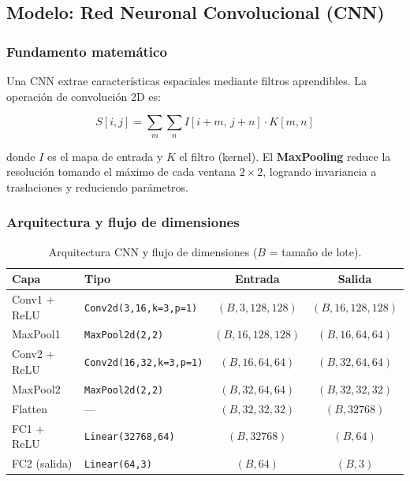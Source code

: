 \documentclass[12pt,a4paper]{article}
\begin{document}
\subsection{Modelo: Red Neuronal Convolucional (CNN)}

\subsubsection{Fundamento matemático}

Una CNN extrae características espaciales mediante filtros aprendibles.
La operación de convolución 2D es:

\[
  S[i,j] = \sum_{m}\sum_{n} I[i+m,\, j+n] \cdot K[m,n]
\]

donde $I$ es el mapa de entrada y $K$ el filtro (kernel). El \textbf{MaxPooling}
reduce la resolución tomando el máximo de cada ventana $2 \times 2$, logrando
invariancia a traslaciones y reduciendo parámetros.

\subsubsection{Arquitectura y flujo de dimensiones}

\begin{table}[H]
  \centering
  \small
  \begin{tabular}{llcc}
    \toprule
    \textbf{Capa} & \textbf{Tipo} & \textbf{Entrada} & \textbf{Salida} \\
    \midrule
    Conv1 + ReLU & \texttt{Conv2d(3,16,k=3,p=1)}  & $(B,3,128,128)$  & $(B,16,128,128)$ \\
    MaxPool1     & \texttt{MaxPool2d(2,2)}          & $(B,16,128,128)$ & $(B,16,64,64)$   \\
    Conv2 + ReLU & \texttt{Conv2d(16,32,k=3,p=1)} & $(B,16,64,64)$   & $(B,32,64,64)$   \\
    MaxPool2     & \texttt{MaxPool2d(2,2)}          & $(B,32,64,64)$   & $(B,32,32,32)$   \\
    Flatten      & —                                & $(B,32,32,32)$   & $(B,32768)$      \\
    FC1 + ReLU   & \texttt{Linear(32768,64)}        & $(B,32768)$      & $(B,64)$         \\
    FC2 (salida) & \texttt{Linear(64,3)}            & $(B,64)$         & $(B,3)$          \\
    \bottomrule
  \end{tabular}
  \caption{Arquitectura CNN y flujo de dimensiones ($B$ = tamaño de lote).}
\end{table}
\end{document}
